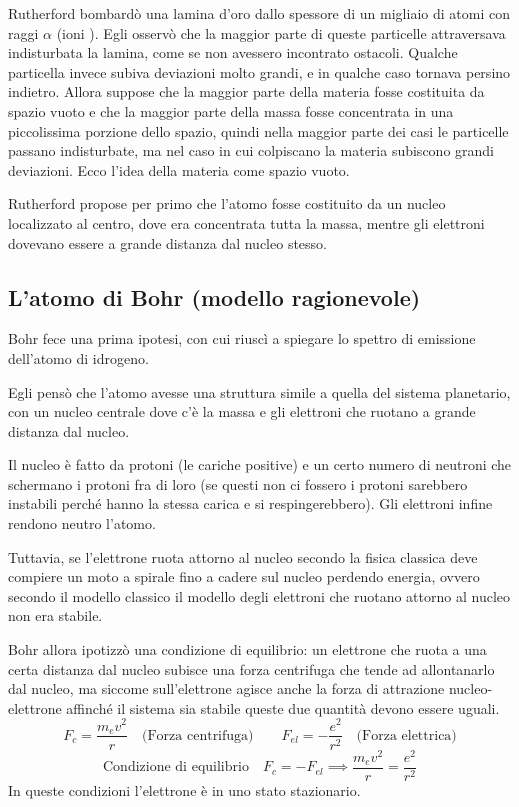 Rutherford bombardò una lamina d'oro dallo spessore di un migliaio di atomi con raggi $\alpha$ (ioni ). Egli osservò che la maggior parte di queste particelle attraversava indisturbata la lamina, come se non avessero incontrato ostacoli.
Qualche particella invece subiva deviazioni molto grandi, e in qualche caso tornava persino indietro. Allora suppose che la maggior parte della materia fosse costituita da spazio vuoto e che la maggior parte della massa  fosse concentrata in una piccolissima porzione dello spazio, quindi nella maggior parte dei casi le particelle passano indisturbate, ma nel caso in cui colpiscano la materia subiscono grandi deviazioni. Ecco l'idea della materia come spazio vuoto.

Rutherford propose per primo che l'atomo fosse costituito da un nucleo localizzato al centro, dove era concentrata tutta la massa, mentre gli elettroni dovevano essere a grande distanza dal nucleo stesso.
\subsection{L'atomo di Bohr (modello ragionevole)}
Bohr fece una prima ipotesi, con cui riuscì a spiegare lo spettro di emissione dell'atomo di idrogeno.

Egli pensò che l'atomo avesse una struttura simile a quella del sistema planetario, con un nucleo centrale dove c'è la massa e gli elettroni che ruotano a grande distanza dal nucleo.

Il nucleo è fatto da protoni (le cariche positive) e un certo numero di neutroni che schermano i protoni fra di loro (se questi non ci fossero i protoni sarebbero instabili perché hanno la stessa carica e si respingerebbero). Gli elettroni infine rendono neutro l'atomo.

Tuttavia, se l'elettrone ruota attorno al nucleo secondo la fisica classica deve compiere un moto a spirale fino a cadere sul nucleo perdendo energia, ovvero secondo il modello classico il modello degli elettroni che ruotano attorno al nucleo non era stabile.

Bohr allora ipotizzò una condizione di equilibrio: un elettrone che ruota a una certa distanza dal nucleo subisce una forza centrifuga che tende ad allontanarlo dal nucleo, ma siccome sull'elettrone agisce anche la forza di attrazione nucleo-elettrone affinché il sistema sia stabile queste due quantità devono essere uguali.
$$F_c=\frac{m_ev^2}{r} \quad \text{(Forza centrifuga)} \qquad F_{el}=-\frac{e^2}{r^2} \quad \text{(Forza elettrica)}$$
$$\text{Condizione di equilibrio} \quad F_c=-F_{el} \implies \frac{m_ev^2}{r}=\frac{e^2}{r^2}$$
In queste condizioni l'elettrone è in uno stato stazionario.

